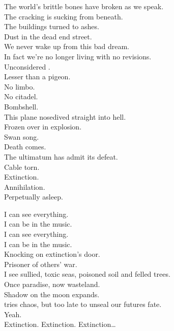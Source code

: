 The world's brittle bones have broken as we speak. \\
The cracking  is sucking from beneath. \\
The buildings turned to ashes. \\
Dust in the dead end street. \\
We never wake up from this bad dream. \\

In fact we're no longer living with no revisions. \\
Unconsidered . \\
Lesser than a pigeon. \\
No limbo. \\
No citadel. \\
Bombshell. \\
This plane nosedived straight into hell. \\
Frozen over in explosion. \\

Swan song. \\
Death comes. \\
The ultimatum has admit its defeat. \\
Cable torn. \\
Extinction. \\
Annihilation. \\
Perpetually asleep. \\



I can see everything. \\
I can be in the music. \\
I can see everything. \\
I can be in the music. \\

Knocking on extinction's door. \\
Prisoner of others' war. \\
I see sullied, toxic seas, poisoned soil and felled trees. \\
Once paradise, now wasteland. \\
Shadow on the moon expands. \\
 tries chaos, but too late to unseal our futures fate. \\
Yeah. \\

Extinction. Extinction. Extinction… \\

